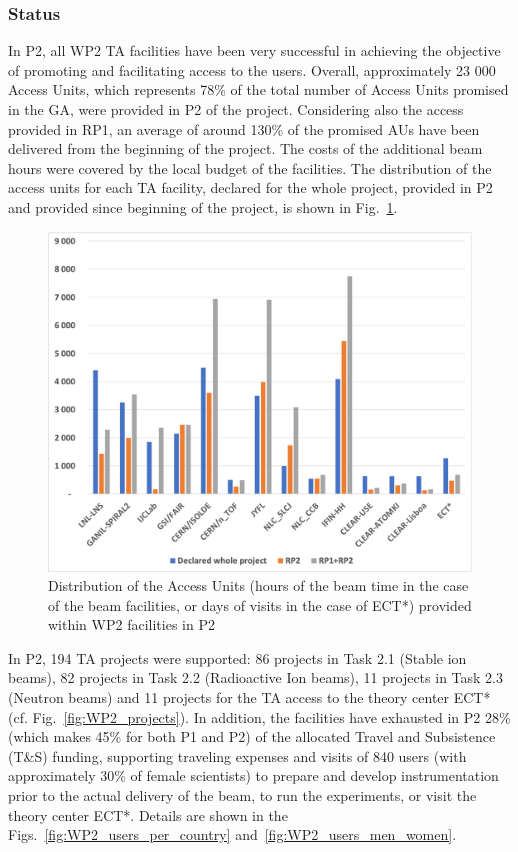 \subsubsection*{Status}


In P2, all WP2 TA facilities have been very successful in achieving the objective of promoting and facilitating access to the users. Overall, approximately 23 000 Access Units, which represents  78\% of the total number of Access Units promised in the GA, were provided in P2 of the project. 
Considering also the access provided in RP1, 
an average of around 130\% of the promised AUs have been delivered from the beginning of the project. The costs of the additional beam hours were covered by the local budget of the facilities. The distribution of the access units for each TA facility, declared for the whole project, provided in P2 and provided since beginning of the project, is shown in Fig.~\ref{fig:WP2_AU_statistics}.

\begin{figure}[!h]
    \centering
    \includegraphics[width=0.8\linewidth]{graphics/WP2_AU_statistics.png}
    \caption{Distribution of the Access Units (hours of the beam time in the case of the beam facilities, or days of visits in the case of ECT*) provided within WP2 facilities in P2}
    \label{fig:WP2_AU_statistics}
\end{figure}

In P2, 194 TA projects were supported: 86 projects in Task 2.1 (Stable ion beams), 82 projects in Task 2.2 (Radioactive Ion beams), 11 projects in Task 2.3 (Neutron beams) and 11 projects for the TA access to the theory center ECT* (cf. Fig.~\ref{fig:WP2_projects}).  In addition, the facilities have exhausted in P2 28\% (which makes 45\% for both P1 and P2) of the allocated Travel and Subsistence (T\&S) funding, supporting traveling expenses and visits of 840 users (with approximately 30\% of female scientists) to prepare and develop instrumentation prior to the actual delivery of the beam, to run the experiments, or visit the theory center ECT*. Details are shown in the Figs.~\ref{fig:WP2_users_per_country} and~\ref{fig:WP2_users_men_women}. 

